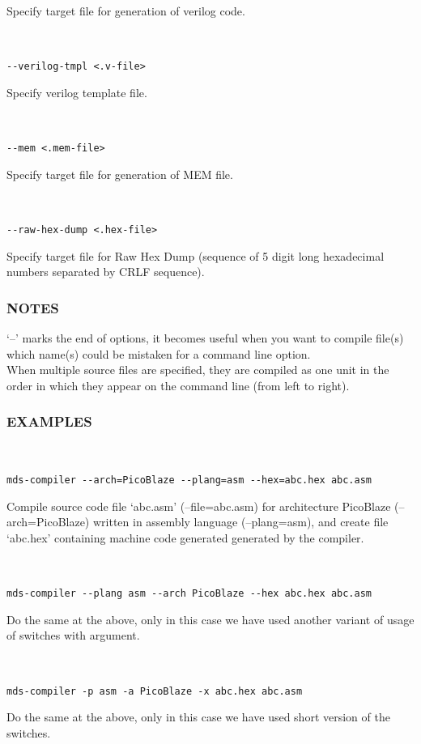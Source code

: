            Specify target file for generation of verilog code.
             {
            ~\\
            \usecodefont

            \verb'--verilog-tmpl <.v-file>'\\
            }
            Specify verilog template file.
             {
            ~\\
            \usecodefont

            \verb'--mem <.mem-file>'\\
            }
            Specify target file for generation of MEM file.
             {
            ~\\
            \usecodefont

            \verb'--raw-hex-dump <.hex-file>'\\
            }
            Specify target file for Raw Hex Dump (sequence of 5 digit long hexadecimal numbers separated by CRLF sequence).\\

        \subsubsection{NOTES}
            `--' marks the end of options, it becomes useful when you want to compile file(s) which name(s) could be mistaken for a command line option.\\

            When multiple source files are specified, they are compiled as one unit in the order in which they appear on the command line (from left to right).
        \subsubsection{EXAMPLES}
            {
            ~\\
            \usecodefont

            \verb'mds-compiler --arch=PicoBlaze --plang=asm --hex=abc.hex abc.asm'\\
            }
            Compile source code file `abc.asm' (--file=abc.asm) for architecture PicoBlaze (--arch=PicoBlaze) written in assembly language (--plang=asm), and create file `abc.hex' containing machine code generated generated by the compiler.
             {
            ~\\
            \usecodefont

            \verb'mds-compiler --plang asm --arch PicoBlaze --hex abc.hex abc.asm'\\
            }
            Do the same at the above, only in this case we have used another variant of usage of switches with argument.
             {
            ~\\
            \usecodefont

            \verb'mds-compiler -p asm -a PicoBlaze -x abc.hex abc.asm'\\
            }
            Do the same at the above, only in this case we have used short version of the switches.\\

